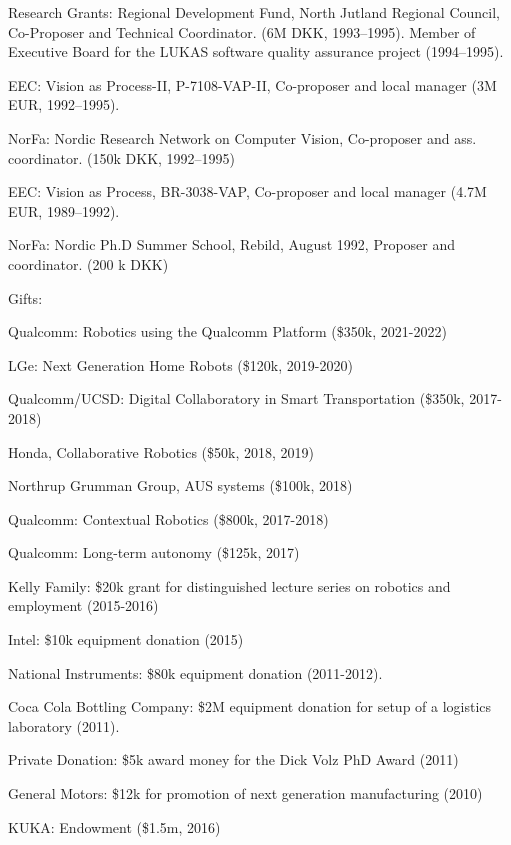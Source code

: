 \documentclass{article}
\begin{document}
\begin{cv}
\begin{cvlist}{Research Grants:}
  Regional Development Fund, North Jutland Regional Council,
  Co-Proposer and Technical Coordinator. (6M DKK, 1993--1995). Member
  of  Executive Board for the LUKAS software quality assurance project
  (1994--1995).%
\item EEC: Vision as Process-II, P-7108-VAP-II, Co-proposer and local
  manager (3M EUR, 1992--1995).%
\item NorFa: Nordic Research Network on Computer Vision, Co-proposer
  and ass. coordinator.  (150k DKK, 1992--1995)%
\item EEC: Vision as Process, BR-3038-VAP, Co-proposer and local
  manager (4.7M EUR, 1989--1992).%
\item NorFa: Nordic Ph.D Summer School, Rebild, August 1992, Proposer
  and coordinator. (200 k DKK)%
\end{cvlist}

\begin{cvlist}{Gifts:}
\item Qualcomm: Robotics using the Qualcomm Platform (\$350k, 2021-2022)
\item LGe: Next Generation Home Robots (\$120k, 2019-2020)
\item Qualcomm/UCSD: Digital Collaboratory in Smart Transportation
  (\$350k, 2017-2018)
\item Honda, Collaborative Robotics (\$50k, 2018, 2019)
\item Northrup Grumman Group, AUS systems (\$100k, 2018)
\item Qualcomm: Contextual Robotics (\$800k, 2017-2018)
\item Qualcomm: Long-term autonomy (\$125k, 2017)
\item Kelly Family: \$20k grant for distinguished lecture series on
  robotics and employment (2015-2016)
\item Intel: \$10k equipment donation (2015)
\item National Instruments: \$80k equipment donation (2011-2012).
\item Coca Cola Bottling Company: \$2M equipment donation for setup of
  a logistics laboratory (2011).
\item Private Donation: \$5k award money for the Dick Volz PhD Award
  (2011)
\item General Motors: \$12k for promotion of next generation
  manufacturing (2010)
\item KUKA: Endowment (\$1.5m, 2016)
\end{cvlist}


\end{cv}
\end{document}
